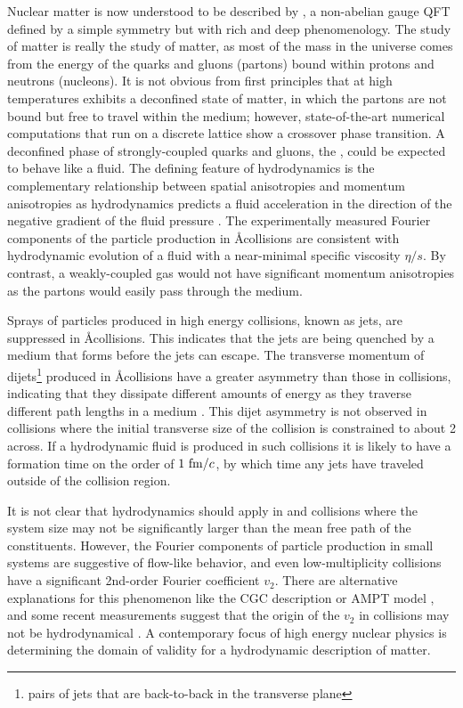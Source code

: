 Nuclear matter is now understood to be described by \qcd, a non-abelian gauge \ac{QFT} defined by a simple symmetry but with rich and deep phenomenology.
The study of \qcd matter is really the study of matter, as most of the mass in the universe comes from the energy of the quarks and gluons (partons) bound within protons and neutrons (nucleons).
It is not obvious from first principles that \qcd at high temperatures exhibits a deconfined state of matter, in which the partons are not bound but free to travel within the medium; however, state-of-the-art numerical computations that run \qcd on a discrete lattice show a crossover phase transition.
A deconfined phase of strongly-coupled quarks and gluons, the \qgp, could be expected to behave like a fluid.
The defining feature of hydrodynamics is the complementary relationship between spatial anisotropies and momentum anisotropies as hydrodynamics predicts a fluid acceleration in the direction of the negative gradient of the fluid pressure \cite{Kolb:2003dz}. %
The experimentally measured Fourier components of the particle production in \AA collisions are consistent with hydrodynamic evolution of a fluid with a near-minimal specific viscosity $\eta/s$.
By contrast, a weakly-coupled gas would not have significant momentum anisotropies as the partons would easily pass through the medium.

Sprays of particles produced in high energy collisions, known as jets, are suppressed in \AA collisions.
This indicates that the jets are being quenched by a medium that forms before the jets can escape.
The transverse momentum of dijets\footnote{pairs of jets that are back-to-back in the transverse plane} produced in \AA collisions have a greater asymmetry than those in \pp collisions, indicating that they dissipate different amounts of energy as they traverse different path lengths in a medium \cite{HION-2010-02,HION-2012-11}.
This dijet asymmetry is not observed in \pA collisions where the initial transverse size of the collision is constrained to about 2 \fm across.
If a hydrodynamic fluid is produced in such collisions it is likely to have a formation time on the order of $1~\mathrm{fm}/c$, by which time any jets have traveled outside of the collision region.

It is not clear that hydrodynamics should apply in \pA and \pp collisions where the system size may not be significantly larger than the mean free path of the constituents.
However, the Fourier components of particle production in small systems are suggestive of flow-like behavior, and even low-multiplicity \pp collisions have a significant 2nd-order Fourier coefficient $v_2$.
There are alternative explanations for this phenomenon like the \ac{CGC} description \cite{Iancu:2000hn} or \ac{AMPT} model \cite{Lin:2004en}, and some recent measurements suggest that the origin of the $v_2$ in \pp collisions may not be hydrodynamical \cite{ATLAS-CONF-2017-068}.
A contemporary focus of high energy nuclear physics is determining the domain of validity for a hydrodynamic description of \qcd matter.

